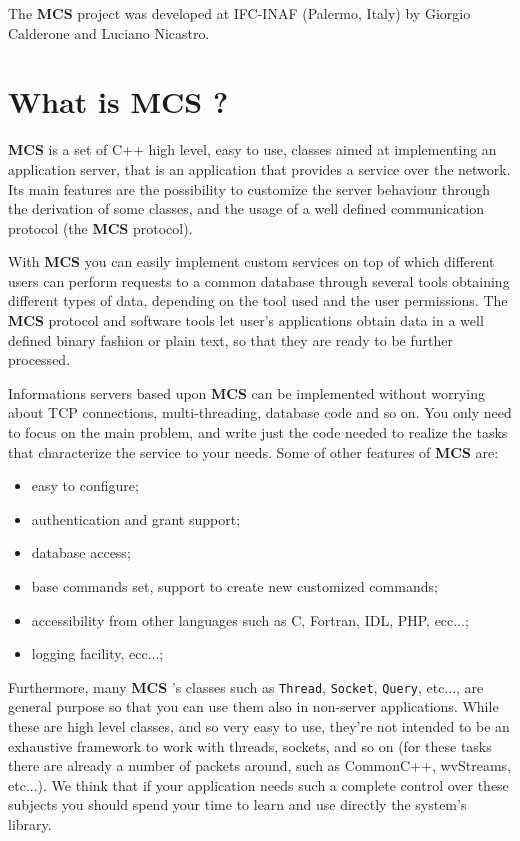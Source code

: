 \documentclass[12pt,titlepage]{book}
\newcommand{\mcs}{\textbf{MCS} }
\begin{document}
\bigskip

\noindent The \mcs project was developed at IFC-INAF (Palermo, Italy)
by Giorgio Calderone and Luciano Nicastro.

\section{What is MCS ?}
\label{sec-whatismcs}
\mcs is a set of C++ high level, easy to use, classes aimed at
implementing an application server, that is an application that
provides a service over the network. Its main features are the
possibility to customize the server behaviour through the derivation
of some classes, and the usage of a well defined communication
protocol (the \mcs protocol).

\bigskip

\noindent With \mcs you can easily implement custom services on top of
which different users can perform requests to a common database
through several tools obtaining different types of data, depending on
the tool used and the user permissions. The \mcs protocol and software
tools let user’s applications obtain data in a well defined binary
fashion or plain text, so that they are ready to be further processed.

\noindent Informations servers based upon \mcs can be implemented
without worrying about TCP connections, multi-threading, database code
and so on. You only need to focus on the main problem, and write just
the code needed to realize the tasks that characterize the service to
your needs. Some of other features of \mcs are:

\begin{itemize}
\item easy to configure;
\item authentication and grant support;
\item database access;
\item base commands set, support to create new customized commands;
\item accessibility from other languages such as C, Fortran, IDL, PHP,
ecc...;
\item logging facility, ecc...;
\end{itemize}

\bigskip

\noindent Furthermore, many \mcs's classes such as \verb|Thread|,
\verb|Socket|, \verb|Query|, etc..., are general purpose so that you
can use them also in non-server applications. While these are high
level classes, and so very easy to use, they're not intended to be an
exhaustive framework to work with threads, sockets, and so on (for
these tasks there are already a number of packets around, such as
CommonC++, wvStreams, etc...). We think that if your application needs
such a complete control over these subjects you should spend your time
to learn and use directly the system's library.
\end{document}
